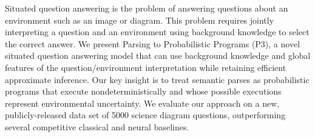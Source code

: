 Situated question answering is the problem of answering questions about an environment such as an image or diagram. This problem requires jointly interpreting a question and an environment using background knowledge to select the correct answer. We present Parsing to Probabilistic Programs (P3), a novel situated question answering model that can use background knowledge and global features of the question/environment interpretation while retaining efficient approximate inference. Our key insight is to treat semantic parses as probabilistic programs that execute nondeterministically and whose possible executions represent environmental uncertainty. We evaluate our approach on a new, publicly-released data set of 5000 science diagram questions, outperforming several competitive classical and neural baselines.
